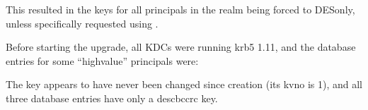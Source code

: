\documentclass[letterpaper,10pt,english]{sphinxmanual}
\begin{document}
\sphinxAtStartPar
This resulted in the keys for all principals in the realm being forced
to DES\sphinxhyphen{}only, unless specifically requested using {\hyperref[\detokenize{admin/admin_commands/kadmin_local:kadmin-1}]{}}.

\sphinxAtStartPar
Before starting the upgrade, all KDCs were running krb5 1.11,
and the database entries for some “high\sphinxhyphen{}value” principals were:

\begin{sphinxVerbatim}[commandchars=\\\{\}]
\PYG{p}{[} \PYG{p}{]}
\PYG{p}{[}\PYG{p}{]}
   
   
\PYG{p}{[}\PYG{p}{]}
\PYG{p}{[} \PYG{p}{]}
\PYG{p}{[}\PYG{p}{]}
   
   
\PYG{p}{[}\PYG{p}{]}
\PYG{p}{[} \PYG{p}{]}
\PYG{p}{[}\PYG{p}{]}
   
   
\PYG{p}{[}\PYG{p}{]}
\end{sphinxVerbatim}

\sphinxAtStartPar
The  key appears to have never been changed since creation
(its kvno is 1), and all three database entries have only a des\sphinxhyphen{}cbc\sphinxhyphen{}crc key.
\end{document}
